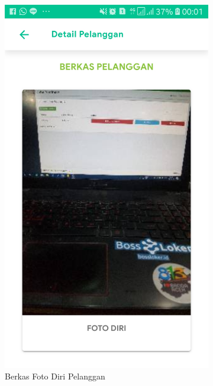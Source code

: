 \begin{figure}[H]
\begin{subfigure}[b]{0.43\linewidth}
			\includegraphics [width = \linewidth]{gambar/android/foto-diri}
			\caption{Berkas Foto Diri Pelanggan}
		\end{subfigure}
		\begin{subfigure}[b]{0.43\linewidth}

\end{subfigure}
\end{figure}
